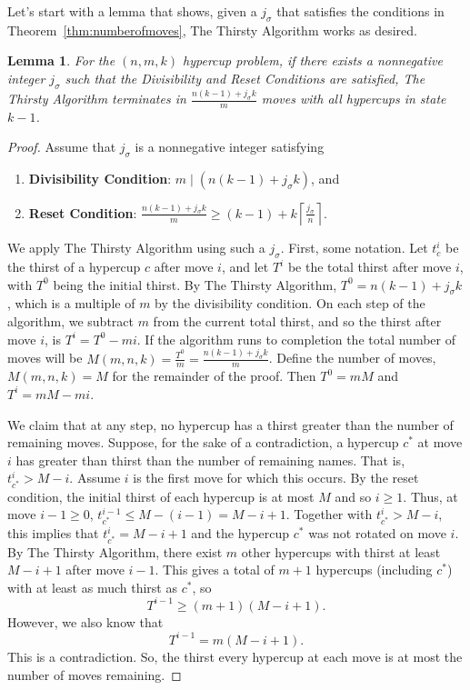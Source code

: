 \documentclass{article}
\theoremstyle{theorem}
\newtheorem{lemma}[theorem]{Lemma}
\theoremstyle{definition}
\begin{document}
Let's start with a lemma that shows, given a $j_\sigma$ that satisfies the conditions in Theorem~\ref{thm:numberofmoves}, The Thirsty Algorithm works as desired.
\begin{lemma}\label{lem:thirstyworks}
    For the $(n,m,k)$ hypercup problem, if there exists a nonnegative integer $j_\sigma$ such that the Divisibility and Reset Conditions are satisfied, The Thirsty Algorithm terminates in $\frac{n(k-1)+j_\sigma k}{m}$ moves with all hypercups in state $k-1$.

\end{lemma}

\begin{proof}
Assume that $j_\sigma$ is a nonnegative integer satisfying
    \begin{enumerate}
        \item \textbf{Divisibility Condition}: $m\mid (n(k-1)+j_\sigma k)$, and
        \item \textbf{Reset Condition}: $\frac{n(k-1)+j_\sigma k}{m}\ge (k-1) + k\left\lceil\frac{j_\sigma}{n}\right\rceil$.
    \end{enumerate} 

  We apply The Thirsty Algorithm using such a $j_\sigma$. First, some notation. Let $t_c^i$ be the thirst of a hypercup $c$ after move $i$, and let $T^i$ be the total thirst after move $i$, with $T^0$ being the initial thirst. By The Thirsty Algorithm, $T^0 = n(k-1) + j_\sigma k$, which is a multiple of $m$ by the divisibility condition. On each step of the algorithm, we subtract $m$ from the current total thirst, and so the thirst after move $i$, is $T^i = T^0 - mi$. If the algorithm runs to completion the total number of moves will be $M(m,n,k)= \frac{T^0}{m}=\frac{n(k-1)+j_\sigma k}{m}$. Define the number of moves, $M(m,n,k) = M$ for the remainder of the proof. Then $T^0 = mM$ and $T^i=mM - mi$.
  
  We claim that at any step, no hypercup has a thirst greater than the number of remaining moves.  Suppose, for the sake of a contradiction, a hypercup $c^*$ at move $i$ has greater than thirst than the number of remaining names. That is, $t_{c^*}^i > M - i$. Assume $i$ is the first move for which this occurs. By the reset condition, the initial thirst of each hypercup is at most $M$ and so $i\geq 1$. Thus, at move $i-1\ge 0$, $t_{c^*}^{i-1} \leq M-(i-1) = M-i+1$. Together with $t_{c^*}^i > M - i$, this implies that $t_{c^*}^i = M-i + 1$ and the hypercup $c^*$ was not rotated on move $i$. By The Thirsty Algorithm, there exist $m$ other hypercups with thirst at least $M - i + 1$ after move $i-1$. This gives  a total of $m+1$ hypercups (including $c^*$) with at least as much thirst as $c^*$, so 
  $$T^{i-1} \geq (m+1)(M-i+1).$$
  However, we also know that 
  $$T^{i-1} = m(M-i+1).$$
  This is a contradiction. So, the thirst every hypercup at each move is at most the number of moves remaining. 
  

\end{proof}
\end{document}
